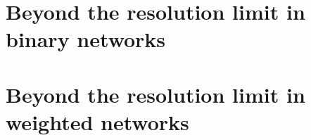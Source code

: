\chapter{Beyond the resolution limit in binary networks}\label{chap:beyondresolutionlimitbinarynetworks}


\chapter{Beyond the resolution limit in weighted networks}\label{chap:beyondresolutionlimitweightednetworks}


% 

% 





% 
% 
%


